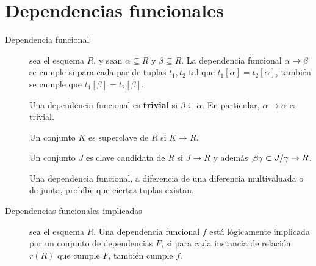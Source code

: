 \documentclass[a4paper, twoside]{article}
\begin{document}
\section{Dependencias funcionales}
\begin{description}
	\item[Dependencia funcional] sea el esquema $R$, y sean $\alpha \subseteq R$ y $\beta\subseteq R$. La dependencia funcional $\alpha \to \beta$ se cumple si para cada par de tuplas $t_{1}, t_{2}$ tal que $t_{1}[\alpha] = t_{2}[\alpha]$, también se cumple que $t_{1}[\beta]=t_{2}[\beta]$. 

	Una dependencia funcional es \textbf{trivial} si $\beta\subseteq\alpha$. En particular, $\alpha\to\alpha$ es trivial.

	Un conjunto $K$ es superclave de $R$ si $K\to R$.

	Un conjunto $J$ es clave candidata de $R$ si $J\to R$ y además $\not\exists\gamma\subset J/\gamma\to R$.

	Una dependencia funcional, a diferencia de una diferencia multivaluada o de junta, prohíbe que ciertas tuplas existan.

	\item[Dependencias funcionales implicadas] sea el esquema $R$. Una dependencia funcional $f$ está lógicamente implicada por un conjunto de dependencias $F$, si para cada instancia de relación $r(R)$ que cumple $F$, también cumple $f$.
\end{description}
\end{document}
